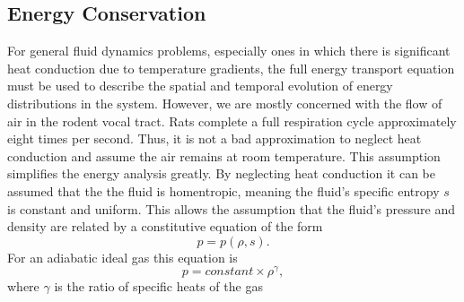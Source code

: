 \documentclass[12pt, letter]{report}
\begin{document}
\subsection{Energy Conservation}
For general fluid dynamics problems, especially ones in which there is significant heat conduction due to temperature gradients, the full energy transport equation must be used to describe the spatial and temporal evolution of energy distributions in the system. However, we are mostly concerned with the flow of air in the rodent vocal tract. Rats complete a full respiration cycle approximately eight times per second. Thus, it is not a bad approximation to neglect heat conduction and assume the air remains at room temperature. This assumption simplifies the energy analysis greatly. By neglecting heat conduction it can be assumed that the the fluid is homentropic, meaning the fluid's specific entropy $s$ is constant and uniform. This allows the assumption that the fluid's pressure and density are related by a constitutive equation of the form
\begin{equation}
\label{eq:constitutive}
p = p(\rho, s).
\end{equation}
For an adiabatic ideal gas this equation is
\begin{equation}
p = constant \times \rho^\gamma,
\end{equation}
where $\gamma$ is the ratio of specific heats of the gas
\end{document}
